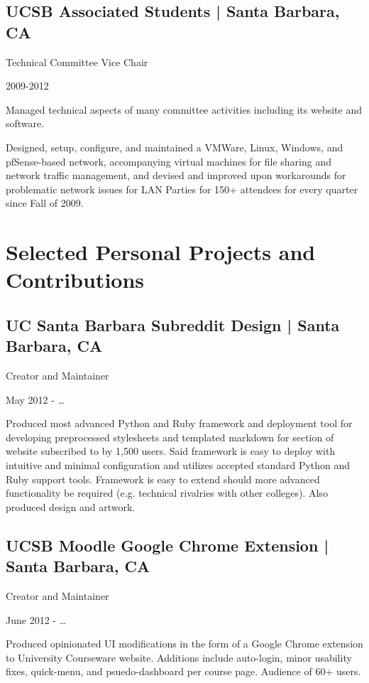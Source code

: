 \documentclass[10pt, letter]{article}
\newcommand{\years}[1]{\marginnote{#1}}
\renewcommand{\years}[1]{#1}
\begin{document}
\begin{multicols}{2}
\subsection*{UCSB Associated Students | {\footnotesize{Santa Barbara, CA}}}

Technical Committee Vice Chair

\years{2009-2012}

Managed technical aspects of many committee activities including its website
and software.

Designed, setup, configure, and maintained a VMWare, Linux, Windows, and
pfSense-based network, accompanying virtual machines for file sharing and
network traffic management, and devised and improved upon workarounds for
problematic network issues for LAN Parties for 150+ attendees for every
quarter since Fall of 2009.

\section*{Selected Personal Projects and Contributions}

\subsection*{UC Santa Barbara Subreddit Design | {\footnotesize{Santa Barbara, CA}}}

Creator and Maintainer

\years{May 2012 - \ldots}

Produced most advanced Python and Ruby framework and deployment tool for
developing preprocessed stylesheets and templated markdown for section of
website subscribed to by 1,500 users. Said framework is easy to deploy with
intuitive and minimal configuration and utilizes accepted standard Python and
Ruby support tools. Framework is easy to extend should more advanced
functionality be required (e.g. technical rivalries with other colleges). Also
produced design and artwork.

\subsection*{UCSB Moodle Google Chrome Extension | {\footnotesize{Santa Barbara, CA}}}

Creator and Maintainer

\years{June 2012 - \ldots}

Produced opinionated UI modifications in the form of a Google Chrome extension
to University Courseware website. Additions include auto-login, minor usability
fixes, quick-menu, and psuedo-dashboard per course page. Audience of 60+ users.


\end{multicols}
\end{document}
